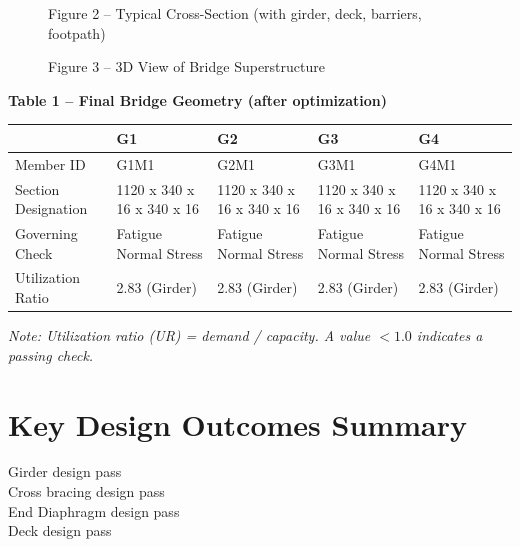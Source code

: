 \documentclass[12pt,a4paper]{report}
\numberwithin{table}{chapter}
\numberwithin{figure}{chapter}
\begin{document}
\newpage

\begin{figure}[H]
\centering
{}
\caption*{Figure 2 -- Typical Cross-Section (with girder, deck, barriers, footpath)}
\end{figure}

\begin{figure}[H]
\centering
{}
\caption*{Figure 3 -- 3D View of Bridge Superstructure}
\end{figure}

\noindent\textbf{Table 1 -- Final Bridge Geometry (after optimization)}

\vspace{0.4em}
\noindent
\begin{tabular}{|C{2.8cm}|C{3.0cm}|C{3.0cm}|C{3.0cm}|C{3.0cm}|}
\hline
  \textbf{} &
  \textbf{G1} &
  \textbf{G2} &
  \textbf{G3} &
  \textbf{G4} \\
\hline
Member ID & G1M1 & G2M1 & G3M1 & G4M1 \\
\hline
Section Designation & 1120 x 340 x 16 x 340 x 16 & 1120 x 340 x 16 x 340 x 16 & 1120 x 340 x 16 x 340 x 16 & 1120 x 340 x 16 x 340 x 16 \\
\hline
Governing Check & Fatigue Normal Stress & Fatigue Normal Stress & Fatigue Normal Stress & Fatigue Normal Stress \\
\hline
Utilization Ratio & 2.83 (Girder) & 2.83 (Girder) & 2.83 (Girder) & 2.83 (Girder) \\
\hline
\end{tabular}

\vspace{0.4em}
\noindent\textit{Note: Utilization ratio (UR) = demand / capacity. A value $< 1.0$ indicates a passing check.}

\vspace{1em}

\section*{Key Design Outcomes Summary}
\label{sec:key-outcomes}

\noindent Girder design pass \\
Cross bracing design pass \\
End Diaphragm design pass \\
Deck design pass
\end{document}
